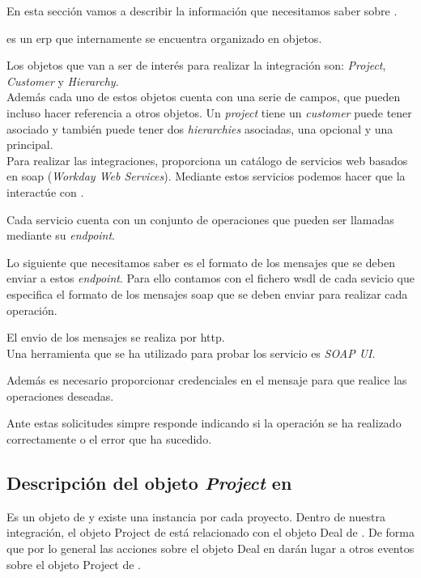 En esta sección vamos a describir la información que necesitamos saber sobre \wday.

\wday{} es un \acrshort{erp} que internamente se encuentra organizado en objetos.
 
Los objetos que van a ser de interés para realizar la integración son:
\textit{Project}, \textit{Customer} y \textit{Hierarchy}.\\

Además cada uno de estos objetos cuenta con una serie de campos, que pueden incluso hacer referencia a otros objetos.
Un \textit{project} tiene un \textit{customer} puede tener asociado y también puede tener dos \textit{hierarchies} asociadas, una opcional y una principal.\\


Para realizar las integraciones, \wday{} proporciona un catálogo de servicios web basados en \acrshort{soap} (\textit{Workday Web Services}). 
Mediante estos servicios podemos hacer que la \iface{} interactúe con \wday.

Cada servicio cuenta con un conjunto de operaciones que pueden ser llamadas mediante su \textit{endpoint}.


Lo siguiente que necesitamos saber es el formato de los mensajes que se deben enviar a estos \textit{endpoint}. Para ello contamos con el fichero \acrshort{wsdl} de cada sevicio que especifica el formato de los mensajes \acrshort{soap} que se deben enviar para realizar cada operación.


El envio de los mensajes se realiza por \acrshort{http}.\\

Una herramienta que se ha utilizado para probar los servicio es \textit{SOAP UI}.

Además es necesario proporcionar credenciales en el mensaje para que \wday{} realice las operaciones deseadas.

Ante estas solicitudes \wday{} simpre responde indicando si la operación se ha realizado correctamente o el error que ha sucedido.



\subsection{Descripción del objeto \textit{Project} en \wday{}}
Es un objeto de \wday{} y existe una instancia por cada proyecto. Dentro de nuestra integración, 
el objeto Project de \wday{} está relacionado con el objeto Deal de \hs. 
De forma que por lo general las acciones sobre el objeto Deal en \hs{} darán lugar a otros eventos
 sobre el objeto Project de \wday{}.\\
 
